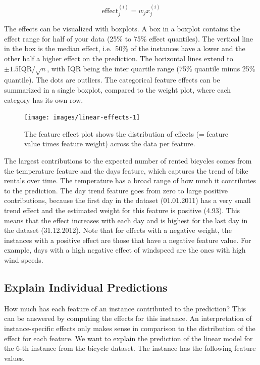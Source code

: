 \documentclass[
  12pt,
]{krantz}
\begin{document}
\[\text{effect}_{j}^{(i)}=w_{j}x_{j}^{(i)}\]

The effects can be visualized with boxplots.
A box in a boxplot contains the effect range for half of your data (25\% to 75\% effect quantiles).
The vertical line in the box is the median effect, i.e.~50\% of the instances have a lower and the other half a higher effect on the prediction.
The horizontal lines extend to \(\pm1.5\text{IQR}/\sqrt{n}\), with IQR being the inter quartile range (75\% quantile minus 25\% quantile).
The dots are outliers.
The categorical feature effects can be summarized in a single boxplot, compared to the weight plot, where each category has its own row.

\begin{figure}

{\centering \texttt{[image: images/linear-effects-1]} 

}

\caption{The feature effect plot shows the distribution of effects (= feature value times feature weight) across the data per feature.}\label{fig:linear-effects}
\end{figure}

The largest contributions to the expected number of rented bicycles comes from the temperature feature and the days feature, which captures the trend of bike rentals over time.
The temperature has a broad range of how much it contributes to the prediction.
The day trend feature goes from zero to large positive contributions, because the first day in the dataset (01.01.2011) has a very small trend effect and the estimated weight for this feature is positive (4.93).
This means that the effect increases with each day and is highest for the last day in the dataset (31.12.2012).
Note that for effects with a negative weight, the instances with a positive effect are those that have a negative feature value.
For example, days with a high negative effect of windspeed are the ones with high wind speeds.

\hypertarget{explain-individual-predictions}{%
\subsection{Explain Individual Predictions}\label{explain-individual-predictions}}

How much has each feature of an instance contributed to the prediction?
This can be answered by computing the effects for this instance.
An interpretation of instance-specific effects only makes sense in comparison to the distribution of the effect for each feature.
We want to explain the prediction of the linear model for the 6-th instance from the bicycle dataset.
The instance has the following feature values.
\end{document}

